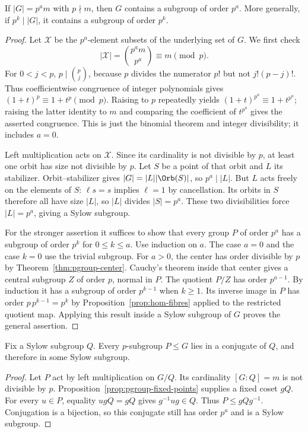 \begin{theorem}\label{thm:sylow-existence}
If $|G|=p^am$ with $p\nmid m$, then $G$ contains a subgroup of order $p^a$. More generally, if $p^k\mid|G|$, it contains a subgroup of order $p^k$.
\end{theorem}
\begin{proof}
Let $\mathcal X$ be the $p^a$-element subsets of the underlying set of $G$. We first check
\[
 |\mathcal X|=\binom{p^am}{p^a}\equiv m\pmod p.
\]
For $0<j<p$, $p\mid\binom pj$, because $p$ divides the numerator $p!$ but not $j!(p-j)!$. Thus coefficientwise congruence of integer polynomials gives $(1+t)^p\equiv1+t^p\pmod p$. Raising to $p$ repeatedly yields $(1+t)^{p^a}\equiv1+t^{p^a}$; raising the latter identity to $m$ and comparing the coefficient of $t^{p^a}$ gives the asserted congruence. This is just the binomial theorem and integer divisibility; it includes $a=0$.

Left multiplication acts on $\mathcal X$. Since its cardinality is not divisible by $p$, at least one orbit has size not divisible by $p$. Let $S$ be a point of that orbit and $L$ its stabilizer. Orbit--stabilizer gives $|G|=|L||\Orb(S)|$, so $p^a\mid|L|$. But $L$ acts freely on the elements of $S$: $\ell s=s$ implies $\ell=1$ by cancellation. Its orbits in $S$ therefore all have size $|L|$, so $|L|$ divides $|S|=p^a$. These two divisibilities force $|L|=p^a$, giving a Sylow subgroup.

For the stronger assertion it suffices to show that every group $P$ of order $p^a$ has a subgroup of order $p^k$ for $0\leq k\leq a$. Use induction on $a$. The case $a=0$ and the case $k=0$ use the trivial subgroup. For $a>0$, the center has order divisible by $p$ by Theorem~\ref{thm:pgroup-center}. Cauchy's theorem inside that center gives a central subgroup $Z$ of order $p$, normal in $P$. The quotient $P/Z$ has order $p^{a-1}$. By induction it has a subgroup of order $p^{k-1}$ when $k\geq1$. Its inverse image in $P$ has order $p\,p^{k-1}=p^k$ by Proposition~\ref{prop:hom-fibres} applied to the restricted quotient map. Applying this result inside a Sylow subgroup of $G$ proves the general assertion.
\end{proof}

\begin{theorem}\label{thm:sylow-containment}
Fix a Sylow subgroup $Q$. Every $p$-subgroup $P\leq G$ lies in a conjugate of $Q$, and therefore in some Sylow subgroup.
\end{theorem}
\begin{proof}
Let $P$ act by left multiplication on $G/Q$. Its cardinality $[G:Q]=m$ is not divisible by $p$. Proposition~\ref{prop:pgroup-fixed-points} supplies a fixed coset $gQ$. For every $u\in P$, equality $ugQ=gQ$ gives $g^{-1}ug\in Q$. Thus $P\leq gQg^{-1}$. Conjugation is a bijection, so this conjugate still has order $p^a$ and is a Sylow subgroup.
\end{proof}

